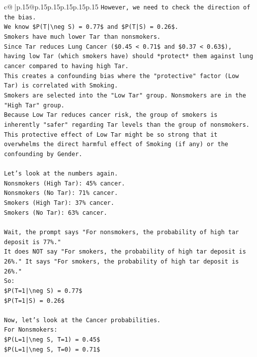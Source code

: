 \documentclass{article}
\begin{document}
{\begin{supertabular}{c@{$\;$}|p{.15\linewidth}@{}p{.15\linewidth}p{.15\linewidth}p{.15\linewidth}p{.15\linewidth}p{.15\linewidth}}
{{{\texttt{However, we need to check the direction of the bias.} \\
\texttt{We know \$P(T|\textbackslash{}neg S) = 0.77\$ and \$P(T|S) = 0.26\$.} \\
\texttt{Smokers have much lower Tar than nonsmokers.} \\
\texttt{Since Tar reduces Lung Cancer (\$0.45 < 0.71\$ and \$0.37 < 0.63\$), having low Tar (which smokers have) should *protect* them against lung cancer compared to having high Tar.} \\
\texttt{This creates a confounding bias where the "protective" factor (Low Tar) is correlated with Smoking.} \\
\texttt{Smokers are selected into the "Low Tar" group. Nonsmokers are in the "High Tar" group.} \\
\texttt{Because Low Tar reduces cancer risk, the group of smokers is inherently "safer" regarding Tar levels than the group of nonsmokers.} \\
\texttt{This protective effect of Low Tar might be so strong that it overwhelms the direct harmful effect of Smoking (if any) or the confounding by Gender.} \\
\\ 
\texttt{Let's look at the numbers again.} \\
\texttt{Nonsmokers (High Tar): 45\% cancer.} \\
\texttt{Nonsmokers (No Tar): 71\% cancer.} \\
\texttt{Smokers (High Tar): 37\% cancer.} \\
\texttt{Smokers (No Tar): 63\% cancer.} \\
\\ 
\texttt{Wait, the prompt says "For nonsmokers, the probability of high tar deposit is 77\%."} \\
\texttt{It does NOT say "For smokers, the probability of high tar deposit is 26\%." It says "For smokers, the probability of high tar deposit is 26\%."} \\
\texttt{So:} \\
\texttt{\$P(T=1|\textbackslash{}neg S) = 0.77\$} \\
\texttt{\$P(T=1|S) = 0.26\$} \\
\\ 
\texttt{Now, let's look at the Cancer probabilities.} \\
\texttt{For Nonsmokers:} \\
\texttt{\$P(L=1|\textbackslash{}neg S, T=1) = 0.45\$} \\
\texttt{\$P(L=1|\textbackslash{}neg S, T=0) = 0.71\$} \\
}}}
\end{supertabular}}
\end{document}
